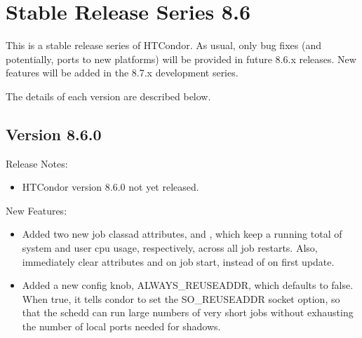 
\section{\label{sec:History-8-6}Stable Release Series 8.6}

This is a stable release series of HTCondor.
As usual, only bug fixes (and potentially, ports to new platforms)
will be provided in future 8.6.x releases.
New features will be added in the 8.7.x development series.

The details of each version are described below.

\subsection*{\label{sec:New-8-6-0}Version 8.6.0}

\noindent Release Notes:

\begin{itemize}

\item HTCondor version 8.6.0 not yet released.

\end{itemize}


\noindent New Features:

\begin{itemize}

\item Added two new job classad attributes,  and 
, which keep a running total of system and user
cpu usage, respectively, across all job restarts.  Also, immediately clear attributes
 and  on job start, instead of on first update.

\item Added a new config knob, ALWAYS\_REUSEADDR, which defaults to false.
When true, it tells condor to set the SO\_REUSEADDR socket option, so that
the schedd can run large numbers of very short jobs without exhausting the
number of local ports needed for shadows.

\end{itemize}

